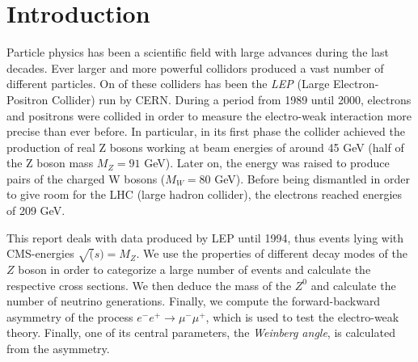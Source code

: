 \section{Introduction}

Particle physics has been a scientific field with large advances 
during the last decades. Ever larger and more powerful collidors 
produced a vast number of different particles. On of these colliders 
has been the \emph{LEP} (Large Electron-Positron Collider) run by CERN\@.
During a period from 1989 until 2000, electrons and positrons were 
collided in order to measure the electro-weak interaction more precise 
than ever before. In particular, in its first phase the collider 
achieved the production of real Z bosons working at beam energies of 
around 45 GeV (half of the Z boson mass $M_Z = 91$ GeV). Later on, 
the energy was raised to produce pairs of the charged W bosons 
($M_W = 80$ GeV). Before being dismantled in order to give room 
for the LHC (large hadron collider), the electrons reached energies 
of 209 GeV. 


This report deals with data produced by LEP until 1994, thus events 
lying with CMS-energies $\sqrt(s) = M_Z$. We use the properties of 
different decay modes of the $Z$ boson in order to categorize a 
large number of events and calculate the respective cross sections. 
We then deduce the mass of the $Z^0$ and calculate the number of 
neutrino generations. Finally, we compute the forward-backward 
asymmetry of the process $e^-e^+ \to \mu^-\mu^+$, which is used 
to test the electro-weak theory. Finally, one of its central 
parameters, the \emph{Weinberg angle}, is calculated from the 
asymmetry. 
